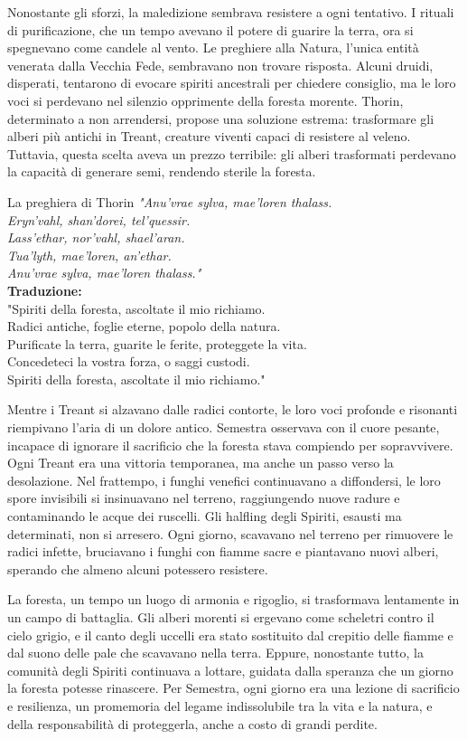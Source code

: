 \documentclass[letterpaper,twocolumn,openany,nodeprecatedcode]{dndbook}
\begin{document}
Nonostante gli sforzi, la maledizione sembrava resistere a ogni tentativo. I rituali di purificazione, che un tempo avevano il potere di guarire la terra, ora si spegnevano come candele al vento. Le preghiere alla Natura, l’unica entità venerata dalla Vecchia Fede, sembravano non trovare risposta. Alcuni druidi, disperati, tentarono di evocare spiriti ancestrali per chiedere consiglio, ma le loro voci si perdevano nel silenzio opprimente della foresta morente. Thorin, determinato a non arrendersi, propose una soluzione estrema: trasformare gli alberi più antichi in Treant, creature viventi capaci di resistere al veleno. Tuttavia, questa scelta aveva un prezzo terribile: gli alberi trasformati perdevano la capacità di generare semi, rendendo sterile la foresta.
\begin{DndSidebar}[float=!b]{La preghiera di Thorin}
  \textit{
    "Anu'vrae sylva, mae'loren thalass.\\
    Eryn'vahl, shan'dorei, tel'quessir.\\
    Lass'ethar, nor'vahl, shael'aran.\\
    Tua'lyth, mae'loren, an'ethar.\\
    Anu'vrae sylva, mae'loren thalass."\\
    }
    \textbf{Traduzione:}\\
"Spiriti della foresta, ascoltate il mio richiamo.\\  
Radici antiche, foglie eterne, popolo della natura.\\  
Purificate la terra, guarite le ferite, proteggete la vita.\\  
Concedeteci la vostra forza, o saggi custodi.  \\
Spiriti della foresta, ascoltate il mio richiamo."
\end{DndSidebar}
Mentre i Treant si alzavano dalle radici contorte, le loro voci profonde e risonanti riempivano l’aria di un dolore antico. Semestra osservava con il cuore pesante, incapace di ignorare il sacrificio che la foresta stava compiendo per sopravvivere. Ogni Treant era una vittoria temporanea, ma anche un passo verso la desolazione. Nel frattempo, i funghi venefici continuavano a diffondersi, le loro spore invisibili si insinuavano nel terreno, raggiungendo nuove radure e contaminando le acque dei ruscelli. Gli halfling degli Spiriti, esausti ma determinati, non si arresero. Ogni giorno, scavavano nel terreno per rimuovere le radici infette, bruciavano i funghi con fiamme sacre e piantavano nuovi alberi, sperando che almeno alcuni potessero resistere.

La foresta, un tempo un luogo di armonia e rigoglio, si trasformava lentamente in un campo di battaglia. Gli alberi morenti si ergevano come scheletri contro il cielo grigio, e il canto degli uccelli era stato sostituito dal crepitio delle fiamme e dal suono delle pale che scavavano nella terra. Eppure, nonostante tutto, la comunità degli Spiriti continuava a lottare, guidata dalla speranza che un giorno la foresta potesse rinascere. Per Semestra, ogni giorno era una lezione di sacrificio e resilienza, un promemoria del legame indissolubile tra la vita e la natura, e della responsabilità di proteggerla, anche a costo di grandi perdite.
\end{document}
